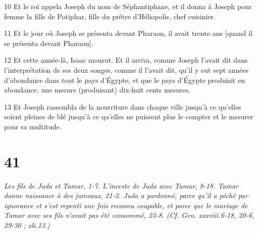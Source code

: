 \par 10 Et le roi appela Joseph du nom de Séphantiphane, et il donna à Joseph pour femme la fille de Potiphar, fille du prêtre d'Héliopolis, chef cuisinier.
\par 11 Et le jour où Joseph se présenta devant Pharaon, il avait trente ans [quand il se présenta devant Pharaon].
\par 12 Et cette année-là, Isaac mourut. Et il arriva, comme Joseph l'avait dit dans l'interprétation de ses deux songes, comme il l'avait dit, qu'il y eut sept années d'abondance dans tout le pays d'Égypte, et que le pays d'Égypte produisit en abondance, une mesure (produisant) dix-huit cents mesures.
\par 13 Et Joseph rassembla de la nourriture dans chaque ville jusqu'à ce qu'elles soient pleines de blé jusqu'à ce qu'elles ne puissent plus le compter et le mesurer pour sa multitude.

\chapter{41}

\par \textit{Les fils de Juda et Tamar, 1-7. L'inceste de Juda avec Tamar, 8-18. Tamar donne naissance à des jumeaux, 21-2. Juda a pardonné, parce qu'il a péché par ignorance et s'est repenti une fois reconnu coupable, et parce que le mariage de Tamar avec ses fils n'avait pas été consommé, 23-8. (Cf. Gen. xxxviii.6-18, 20-6, 29-30 ; xli.13.)}

